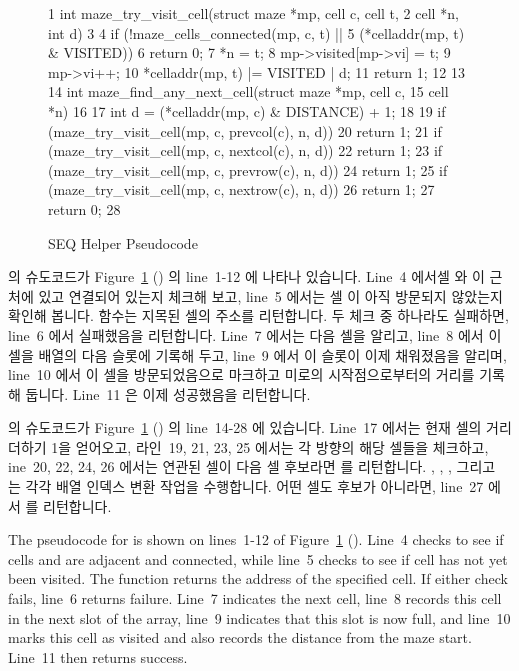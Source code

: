 \begin{figure}[tbp]
{ \scriptsize
\begin{verbbox}
  1 int maze_try_visit_cell(struct maze *mp, cell c, cell t,
  2                         cell *n, int d)
  3 {
  4   if (!maze_cells_connected(mp, c, t) ||
  5       (*celladdr(mp, t) & VISITED))
  6     return 0;
  7   *n = t;
  8   mp->visited[mp->vi] = t;
  9   mp->vi++;
 10   *celladdr(mp, t) |= VISITED | d;
 11   return 1;
 12 }
 13 
 14 int maze_find_any_next_cell(struct maze *mp, cell c,
 15                             cell *n)
 16 {
 17   int d = (*celladdr(mp, c) & DISTANCE) + 1;
 18 
 19   if (maze_try_visit_cell(mp, c, prevcol(c), n, d))
 20     return 1;
 21   if (maze_try_visit_cell(mp, c, nextcol(c), n, d))
 22     return 1;
 23   if (maze_try_visit_cell(mp, c, prevrow(c), n, d))
 24     return 1;
 25   if (maze_try_visit_cell(mp, c, nextrow(c), n, d))
 26     return 1;
 27   return 0;
 28 }
\end{verbbox}
}
\centering
\theverbbox
\caption{SEQ Helper Pseudocode}
\label{fig:SMPdesign:SEQ Helper Pseudocode}
\end{figure}

 의 슈도코드가
Figure~\ref{fig:SMPdesign:SEQ Helper Pseudocode}
() 의 line~1-12 에 나타나
있습니다.
Line~4 에서셀  와  이 근처에 있고 연결되어 있는지 체크해 보고,
line~5 에서는 셀  이 아직 방문되지 않았는지 확인해 봅니다.
 함수는 지목된 셀의 주소를 리턴합니다.
두 체크 중 하나라도 실패하면, line~6 에서 실패했음을 리턴합니다.
Line~7 에서는 다음 셀을 알리고, line~8 에서 이 셀을  배열의
다음 슬롯에 기록해 두고, line~9 에서 이 슬롯이 이제 채워졌음을 알리며, line~10
에서 이 셀을 방문되었음으로 마크하고 미로의 시작점으로부터의 거리를 기록해
둡니다.
Line~11 은 이제 성공했음을 리턴합니다.

 의 슈도코드가
Figure~\ref{fig:SMPdesign:SEQ Helper Pseudocode}
() 의 line~14-28 에 있습니다.
Line~17 에서는 현재 셀의 거리 더하기 1을 얻어오고, 라인~19, 21, 23, 25 에서는
각 방향의 해당 셀들을 체크하고, ine~20, 22, 24, 26 에서는 연관된 셀이 다음 셀
후보라면  를 리턴합니다.
, , , 그리고  는 각각
배열 인덱스 변환 작업을 수행합니다.
어떤 셀도 후보가 아니라면, line~27 에서  를 리턴합니다.
\iffalse

The pseudocode for  is shown on lines~1-12
of Figure~\ref{fig:SMPdesign:SEQ Helper Pseudocode}
().
Line~4 checks to see if cells  and  are adjacent and connected,
while line~5 checks to see if cell  has not yet been visited.
The  function returns the address of the specified cell.
If either check fails, line~6 returns failure.
Line~7 indicates the next cell, line~8 records this cell in the next
slot of the  array, line~9 indicates that this slot
is now full, and line~10 marks this cell as visited and also records
the distance from the maze start.  Line~11 then returns success.

